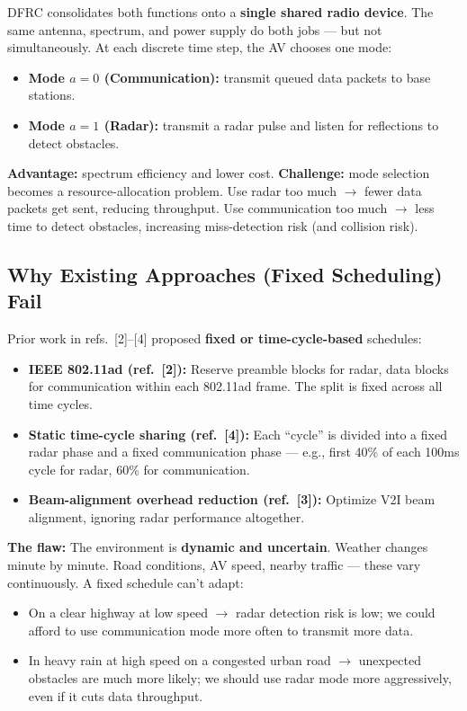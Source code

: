 \documentclass[12pt,a4paper]{article}
\begin{document}
DFRC consolidates both functions onto a \textbf{single shared radio device}. The same antenna, spectrum, and power supply do both jobs --- but not simultaneously. At each discrete time step, the AV chooses one mode:
\begin{itemize}
    \item \textbf{Mode $a=0$ (Communication):} transmit queued data packets to base stations.
    \item \textbf{Mode $a=1$ (Radar):} transmit a radar pulse and listen for reflections to detect obstacles.
\end{itemize}

\noindent\textbf{Advantage:} spectrum efficiency and lower cost.
\noindent\textbf{Challenge:} mode selection becomes a resource-allocation problem. Use radar too much $\rightarrow$ fewer data packets get sent, reducing throughput. Use communication too much $\rightarrow$ less time to detect obstacles, increasing miss-detection risk (and collision risk).

\subsection{Why Existing Approaches (Fixed Scheduling) Fail}

Prior work in refs.~[2]--[4] proposed \textbf{fixed or time-cycle-based} schedules:

\begin{itemize}
    \item \textbf{IEEE 802.11ad (ref.~[2]):} Reserve preamble blocks for radar, data blocks for communication within each 802.11ad frame. The split is fixed across all time cycles.
    \item \textbf{Static time-cycle sharing (ref.~[4]):} Each ``cycle'' is divided into a fixed radar phase and a fixed communication phase --- e.g., first 40\% of each 100ms cycle for radar, 60\% for communication.
    \item \textbf{Beam-alignment overhead reduction (ref.~[3]):} Optimize V2I beam alignment, ignoring radar performance altogether.
\end{itemize}

\noindent\textbf{The flaw:} The environment is \textbf{dynamic and uncertain}. Weather changes minute by minute. Road conditions, AV speed, nearby traffic --- these vary continuously. A fixed schedule can't adapt:
\begin{itemize}
    \item On a clear highway at low speed $\rightarrow$ radar detection risk is low; we could afford to use communication mode more often to transmit more data.
    \item In heavy rain at high speed on a congested urban road $\rightarrow$ unexpected obstacles are much more likely; we should use radar mode more aggressively, even if it cuts data throughput.
\end{itemize}
\end{document}
